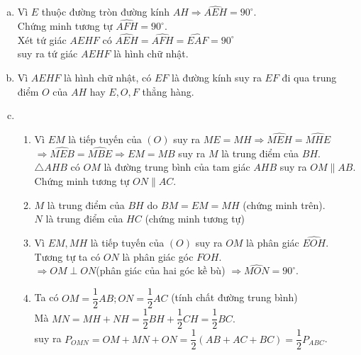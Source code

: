 \begin{bt}
{\begin{center}
		\end{center}
		\begin{enumerate}[a)]
			\item Vì $E$ thuộc đường tròn đường kính $AH\Rightarrow \widehat{AEH} = 90^\circ$.\\
			Chứng minh tương tự $\widehat{AFH} = 90^\circ$.\\
			Xét tứ giác $AEHF$ có $\widehat{AEH} =\widehat{AFH} = \widehat{EAF}= 90^\circ$\\
			suy ra tứ giác $AEHF$ là hình chữ nhật.
			\item Vì $AEHF$ là hình chữ nhật, có $EF$ là đường kính suy ra $EF$ đi qua trung điểm $O$ của $AH$ hay $E,O,F$ thẳng hàng.
			\item 
			\begin{enumerate}[1)]
				\item Vì $EM$ là tiếp tuyến của $(O)$ suy ra $ME = MH\Rightarrow \widehat{MEH} = \widehat{MHE}$\\
				$\Rightarrow \widehat{MEB} = \widehat{MBE}\Rightarrow EM = MB$ suy ra $M$ là trung điểm của $BH$.\\
				$\triangle AHB$ có $OM$ là đường trung bình của tam giác $AHB$ suy ra $OM\parallel AB$.\\
				Chứng minh tương tự $ON\parallel AC$.
				\item $M$ là trung điểm của $BH$ do $BM = EM = MH$ (chứng minh trên).\\
				$N$ là trung điểm của $HC$ (chứng minh tương tự)
				\item Vì $EM, MH$ là tiếp tuyến của $(O)$ suy ra $OM$ là phân giác $\widehat{EOH}$. Tương tự ta có $ON$ là phân giác góc $FOH$.\\
				$\Rightarrow OM\perp ON$(phân giác của hai góc kề bù) $\Rightarrow\widehat{MON} = 90^\circ$.
				\item Ta có $OM = \dfrac{1}{2}AB; ON = \dfrac{1}{2}AC$ (tính chất đường trung bình)\\
				Mà $MN = MH + NH  =\dfrac{1}{2}BH+\dfrac{1}{2}CH = \dfrac{1}{2}BC.$\\
				suy ra $P_{OMN} = OM + MN + ON = \dfrac{1}{2}\left(AB + AC + BC\right)=\dfrac{1}{2}P_{ABC}$.
			\end{enumerate}
		\end{enumerate}
	}
\end{bt}

